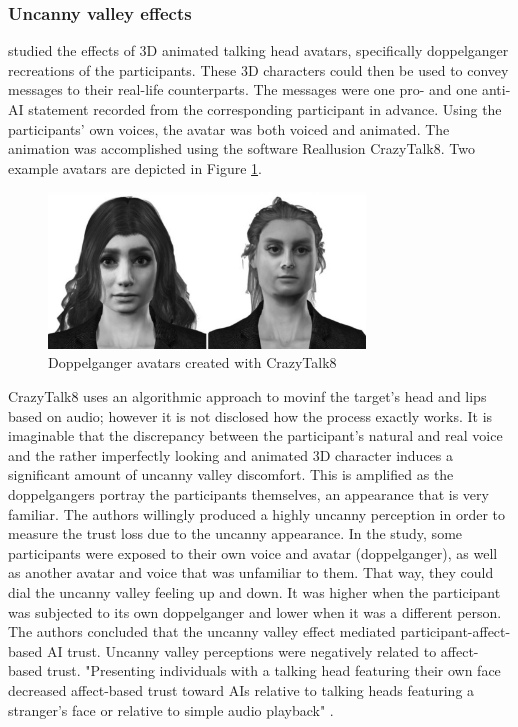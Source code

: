 \documentclass[
  a4paper,  %
  twoside,  %
  bibliography=totoc,
  headsepline,
  cleardoublepage=empty,
  parskip=half,
  draft=false
]{scrbook}
\begin{document}
\subsubsection*{Uncanny valley effects}
 studied the effects of 3D animated talking head avatars, specifically doppelganger recreations of the participants. These 3D characters could then be used to convey messages to their real-life counterparts. The messages were one pro- and one anti-AI statement recorded from the corresponding participant in advance. Using the participants' own voices, the avatar was both voiced and animated. The animation was accomplished using the software Reallusion CrazyTalk8. Two example avatars are depicted in Figure \ref{fig:uncanny-avatars}.
\begin{figure}[h]
  \centering
  \includegraphics[width=0.75\textwidth]{./graphics/images/uncanny-avatars.png}
  \caption{Doppelganger avatars created with CrazyTalk8 \cite{weismanFaceUncannyEffects2021}}
  \label{fig:uncanny-avatars}
\end{figure}
CrazyTalk8 uses an algorithmic approach to movinf the target's head and lips based on audio; however it is not disclosed how the process exactly works. It is imaginable that the discrepancy between the participant's natural and real voice and the rather imperfectly looking and animated 3D character induces a significant amount of uncanny valley discomfort. This is amplified as the doppelgangers portray the participants themselves, an appearance that is very familiar. The authors willingly produced a highly uncanny perception in order to measure the trust loss due to the uncanny appearance. In the study, some participants were exposed to their own voice and avatar (doppelganger), as well as another avatar and voice that was unfamiliar to them. That way, they could dial the uncanny valley feeling up and down. It was higher when the participant was subjected to its own doppelganger and lower when it was a different person.\\
The authors concluded that the uncanny valley effect mediated participant-affect-based AI trust. Uncanny valley perceptions were negatively related to affect-based trust. "Presenting individuals with a talking head featuring their own face decreased affect-based trust toward AIs relative to talking heads featuring a stranger's face or relative to simple audio playback" \cite{weismanFaceUncannyEffects2021}. \\
\end{document}
